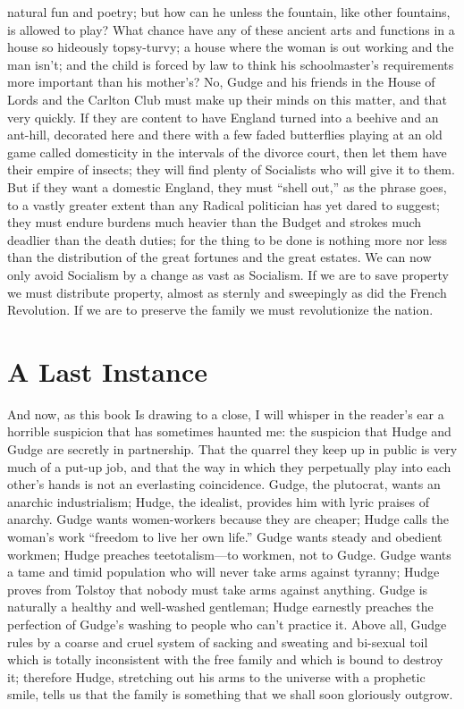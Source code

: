 \documentclass{book}
\begin{document}
natural fun and poetry; but how can he unless the fountain, like other fountains, is allowed to play? What chance have any of these ancient arts and functions in a house so hideously topsy-turvy; a house where the woman is out working and the man isn’t; and the child is forced by law to think his schoolmaster’s requirements more important than his mother’s? No, Gudge and his friends in the House of Lords and the Carlton Club must make up their minds on this matter, and that very quickly. If they are content to have England turned into a beehive and an ant-hill, decorated here and there with a few faded butterflies playing at an old game called domesticity in the intervals of the divorce court, then let them have their empire of insects; they will find plenty of Socialists who will give it to them. But if they want a domestic England, they must “shell out,” as the phrase goes, to a vastly greater extent than any Radical politician has yet dared to suggest; they must endure burdens much heavier than the Budget and strokes much deadlier than the death duties; for the thing to be done is nothing more nor less than the distribution of the great fortunes and the great estates. We can now only avoid Socialism by a change as vast as Socialism. If we are to save property we must distribute property, almost as sternly and sweepingly as did the French Revolution. If we are to preserve the family we must revolutionize the nation.

\chapter{A Last Instance}
\label{chapter-50}
And now, as this book Is drawing to a close, I will whisper in the reader’s ear a horrible suspicion that has sometimes haunted me: the suspicion that Hudge and Gudge are secretly in partnership. That the quarrel they keep up in public is very much of a put-up job, and that the way in which they perpetually play into each other’s hands is not an everlasting coincidence. Gudge, the plutocrat, wants an anarchic industrialism; Hudge, the idealist, provides him with lyric praises of anarchy. Gudge wants women-workers because they are cheaper; Hudge calls the woman’s work “freedom to live her own life.” Gudge wants steady and obedient workmen; Hudge preaches teetotalism—to workmen, not to Gudge. Gudge wants a tame and timid population who will never take arms against tyranny; Hudge proves from Tolstoy that nobody must take arms against anything. Gudge is naturally a healthy and well-washed gentleman; Hudge earnestly preaches the perfection of Gudge’s washing to people who can’t practice it. Above all, Gudge rules by a coarse and cruel system of sacking and sweating and bi-sexual toil which is totally inconsistent with the free family and which is bound to destroy it; therefore Hudge, stretching out his arms to the universe with a prophetic smile, tells us that the family is something that we shall soon gloriously outgrow.
\end{document}
